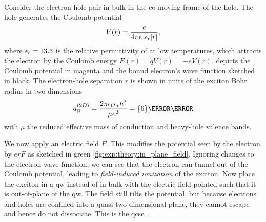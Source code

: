 Consider the electron-hole pair in bulk  in the co-moving frame of the hole.
The hole generates the Coulomb potential
\begin{equation}
    V(r) = \frac{e}{4\pi\epsilon_0\epsilon_{\mathrm{r}}\abs{r}},
\end{equation}
where $\epsilon_{\mathrm{r}} = \num{13.3}$ is the relative permittivity of  at low temperatures, which attracts the electron by the Coulomb energy $E(r) = qV(r) = -eV(r)$.
 depicts the Coulomb potential in magenta and the bound electron's wave function sketched in black.
The electron-hole separation $r$ is shown in units of the exciton Bohr radius in two dimensions~\cite{Olsen2016}
\begin{equation}\label{eq:exp:theory:qcse:bohr_radius_2d}
    a_{\mr{B}}\gth{2D} = \frac{2\pi\eps_0\eps_{\mr{r}}\hbar^2}{\mu e^2} = \qty{6}{\nano\meter}
\end{equation}
with $\mu$ the reduced effective mass of conduction and heavy-hole valence bands.

We now apply an electric field $F$.
This modifies the potential seen by the electron by $erF$ as sketched in green \cref{fig:exp:theory:in_plane_field}.
Ignoring changes to the electron wave function, we can see that the electron can tunnel out of the Coulomb potential, leading to \emph{field-induced ionization} of the exciton.
Now place the exciton in a \gls{qw} instead of in bulk with the electric field pointed such that it is out-of-plane of the \gls{qw}.
The field still tilts the potential, but because electrons and holes are confined into a quasi-two-dimensional plane, they cannot escape and hence do not dissociate.
This is the \acrfull{qcse}~\cite{Miller1984}.

